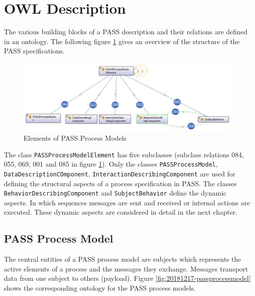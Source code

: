 \section{OWL Description}
\label{OWL-DescriptionSID}

The various building blocks of a PASS description and their relations are defined in an ontology. The following figure \ref{fig:20171217-passprocessmodellelement} gives an overview of the structure of the PASS specifications.   

\begin{figure}[htbp]
	\centering
	\includegraphics[width=0.9\linewidth]{20181026-Ontologie-Bilder/Grafiken-Ontologie/SUbject-Interaction/20171217-PASSProcessModellElement}
	\caption[Elements of PASS Process Models]{Elements of PASS Process Models}
	\label{fig:20171217-passprocessmodellelement}
\end{figure}

The class \texttt{PASSProcessModelElement} has five subclasses (subclass relations 084, 055, 069, 001 and 085 in figure \ref{fig:20171217-passprocessmodellelement}). Only the classes \texttt{PASSProcessModel}, \texttt{DataDescriptionCOmponent}, \texttt{InteractionDescribingComponent} are used for defining the structural aspects of a process specification in PASS. The classes \texttt{BehaviorDescribingComponent} and \texttt{SubjectBehavior} define the dynamic aspects. In which sequences messages are sent and received or internal actions are executed. These dynamic aspects are considered in detail in the next chapter. 

\subsection{PASS Process Model}

The central entities of a PASS process model are subjects which represents the active elements of a process and the messages they exchange. Messages transport data from one subject to others (payload). Figure \ref{fig:20181217-passprocessmodel} shows the corresponding ontology for the PASS process models.

